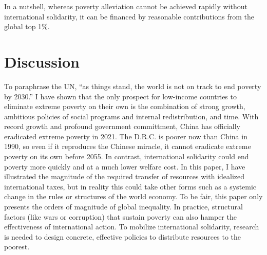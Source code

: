 In a nutshell, whereas poverty alleviation cannot be achieved rapidly without international solidarity, it can be financed by reasonable contributions from the global top 1\%.

\section{Discussion} 

To paraphrase the UN, ``as things stand, the world is not on track to end poverty by 2030.''\cite{un_sustainable_2022} I have shown that the only prospect for low-income countries to eliminate extreme poverty on their own is the combination of strong growth, ambitious policies of social programs and internal redistribution, and time. 
With record growth and profound government committment, China has officially eradicated extreme poverty in 2021. The D.R.C. is poorer now than China in 1990, %
so even if it reproduces the Chinese miracle, it cannot eradicate extreme poverty on its own before 2055. 
In contrast, international solidarity could end poverty more quickly and at a much lower welfare cost. In this paper, I have illustrated the magnitude of the required transfer of resources with idealized international taxes, but in reality this could take other forms such as a systemic change in the rules or structures of the world economy. 
To be fair, this paper only presents the orders of magnitude of global inequality. %
In practice, structural factors (like wars or corruption) that sustain poverty %
can also hamper the effectiveness of international action. 
To mobilize international solidarity, research is needed to design %
concrete, effective policies to distribute resources to the poorest. %

